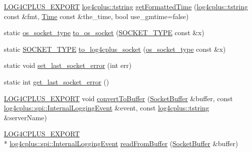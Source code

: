 \begin{DoxyCompactItemize}
\item 
\hyperlink{config_8hxx_ab13cb1a5317c245ee2ef4f2bfe0cfb2d}{L\-O\-G4\-C\-P\-L\-U\-S\-\_\-\-E\-X\-P\-O\-R\-T} \hyperlink{namespacelog4cplus_a3c9287f6ebcddc50355e29d71152117b}{log4cplus\-::tstring} \hyperlink{namespacelog4cplus_1_1helpers_a0980d781aff80518b9c02774625a0ffd}{get\-Formatted\-Time} (\hyperlink{namespacelog4cplus_a3c9287f6ebcddc50355e29d71152117b}{log4cplus\-::tstring} const \&fmt, \hyperlink{namespacelog4cplus_1_1helpers_af05d40c37e1cccf9d11d0cbb7426bcd4}{Time} const \&the\-\_\-time, bool use\-\_\-gmtime=false)
\item 
static \hyperlink{namespacelog4cplus_1_1helpers_a74064c46dd7651c68c1f58b73a1b14ca}{os\-\_\-socket\-\_\-type} \hyperlink{namespacelog4cplus_1_1helpers_a8fe0be58538d32f7d5ad91e430617e2f}{to\-\_\-os\-\_\-socket} (\hyperlink{namespacelog4cplus_1_1helpers_afe2a1567866b6a9e0bfd5d425c3323f2}{S\-O\-C\-K\-E\-T\-\_\-\-T\-Y\-P\-E} const \&x)
\item 
static \hyperlink{namespacelog4cplus_1_1helpers_afe2a1567866b6a9e0bfd5d425c3323f2}{S\-O\-C\-K\-E\-T\-\_\-\-T\-Y\-P\-E} \hyperlink{namespacelog4cplus_1_1helpers_a650bf7ce806dc3fb21f3236b4a85aa46}{to\-\_\-log4cplus\-\_\-socket} (\hyperlink{namespacelog4cplus_1_1helpers_a74064c46dd7651c68c1f58b73a1b14ca}{os\-\_\-socket\-\_\-type} const \&x)
\item 
static void \hyperlink{namespacelog4cplus_1_1helpers_a33574a4728cff5fbf0b7c0d8c4e5682e}{set\-\_\-last\-\_\-socket\-\_\-error} (int err)
\item 
static int \hyperlink{namespacelog4cplus_1_1helpers_a9b90ba0a5cd5cc790f9737a2d76422a8}{get\-\_\-last\-\_\-socket\-\_\-error} ()
\item 
\hyperlink{config_8hxx_ab13cb1a5317c245ee2ef4f2bfe0cfb2d}{L\-O\-G4\-C\-P\-L\-U\-S\-\_\-\-E\-X\-P\-O\-R\-T} void \hyperlink{namespacelog4cplus_1_1helpers_a663b18db3f4fbe30b6e81e543b1239c0}{convert\-To\-Buffer} (\hyperlink{classlog4cplus_1_1helpers_1_1SocketBuffer}{Socket\-Buffer} \&buffer, const \hyperlink{classlog4cplus_1_1spi_1_1InternalLoggingEvent}{log4cplus\-::spi\-::\-Internal\-Logging\-Event} \&event, const \hyperlink{namespacelog4cplus_a3c9287f6ebcddc50355e29d71152117b}{log4cplus\-::tstring} \&server\-Name)
\item 
\hyperlink{config_8hxx_ab13cb1a5317c245ee2ef4f2bfe0cfb2d}{L\-O\-G4\-C\-P\-L\-U\-S\-\_\-\-E\-X\-P\-O\-R\-T} \\*
\hyperlink{classlog4cplus_1_1spi_1_1InternalLoggingEvent}{log4cplus\-::spi\-::\-Internal\-Logging\-Event} \hyperlink{namespacelog4cplus_1_1helpers_a61dbd76844d1814eae74feabc7066549}{read\-From\-Buffer} (\hyperlink{classlog4cplus_1_1helpers_1_1SocketBuffer}{Socket\-Buffer} \&buffer)

\end{DoxyCompactItemize}
